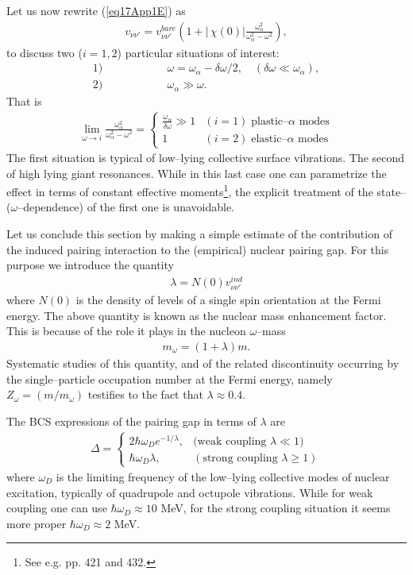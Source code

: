 \begin{subappendices}
Let us now rewrite (\ref{eq17App1E}) as
\begin{align}
v_{\nu\nu'}=v_{\nu\nu'}^{bare}\left(1+|\,\chi(0)|\frac{\omega_\alpha^2}{\omega^2_\alpha-\omega^2}\right),
\end{align}
to discuss two ($i=1,2$) particular situations of interest:
   \begin{align}
1)&\quad\quad\quad\quad\quad \omega=\omega_\alpha-\delta\omega/2,\quad(\delta\omega\ll\omega_\alpha),\\
2)&\quad\quad\quad\quad\quad \omega_\alpha\gg\omega.
   \end{align}
That is
\begin{align}
\lim_{\omega\rightarrow i} \frac{\omega_\alpha^2}{\omega^2_\alpha-\omega^2}=\left\{\begin{array}{ll}
 \frac{\omega_\alpha}{\delta \omega}\gg1&(i=1)\;\text{plastic--} \alpha\text{ modes}\\ 
 1&(i=2)\;\text{elastic--} \alpha\text{ modes}
\end{array}
\right. 
\end{align}
The first situation is typical of low--lying collective surface vibrations. The second of high lying giant resonances. While in this last case one can parametrize the effect in terms of constant effective moments\footnote{See e.g. \cite{Bohr:75} pp. 421 and 432.}, the explicit treatment of the state-- ($\omega$--dependence) of the first one is unavoidable.


Let us conclude this section by making a simple estimate of the contribution of the induced pairing interaction to the (empirical) nuclear pairing gap. For this purpose we introduce the quantity
 \begin{align}
\lambda=N(0)v_{\nu\nu'}^{ind}
 \end{align}
where $N(0)$ is the density of levels of a single spin orientation at the Fermi energy. The above quantity is known as the nuclear mass enhancement factor. This is because of the role it plays in the nucleon $\omega$--mass
 \begin{align}
m_\omega=(1+\lambda)m.
 \end{align}
Systematic studies of this quantity, and of the related discontinuity occurring by the single--particle occupation number at the Fermi energy, namely $Z_\omega=(m/m_\omega)$ testifies to the fact that $\lambda\approx0.4$.


The BCS expressions of the pairing gap in terms of $\lambda$ are
\begin{align}\label{eq24App3E}
\Delta=\left\{\begin{array}{ll}
2\hbar\omega_De^{-1/\lambda},&\text{(weak coupling } \lambda\ll1)\\ 
\hbar\omega_D\lambda,&(\text{strong coupling }\lambda\geq1)
\end{array}
\right. 
\end{align}
where $\omega_D$ is the limiting frequency of the low--lying collective modes of nuclear excitation, typically of quadrupole and octupole vibrations. While for weak coupling one can use $\hbar\omega_D\approx10$ MeV, for the strong coupling situation it seems more proper $\hbar\omega_D\approx 2$ MeV.



\end{subappendices}
